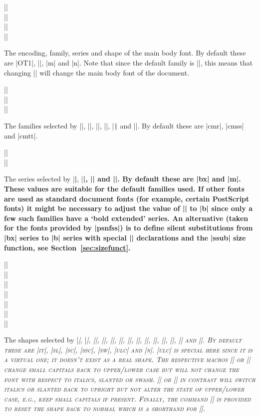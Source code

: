 \documentclass{ltxguide}[1995/11/28]
\begin{document}
\begin{decl}
  |\encodingdefault| \\
  |\familydefault|   \\
  |\seriesdefault|   \\
  |\shapedefault|
\end{decl}
The encoding, family, series and shape of the main body font.  By
default these are |OT1|, |\rmdefault|, |m| and |n|.  Note that since the
default family is |\rmdefault|, this means that changing |\rmdefault|
will change the main body font of the document.

\begin{decl}
  |\rmdefault| \\
  |\sfdefault| \\
  |\ttdefault|
\end{decl}
The families selected by |\textrm|, |\rmfamily|, |\textsf|, |\sffamily|,
|\texttt| and |\ttfamily|.  By default these are |cmr|, |cmss| and
|cmtt|.

\begin{decl}
  |\bfdefault| \\
  |\mddefault|
\end{decl}
The series selected by |\textbf|, |\bfseries|, |\textmd| and
|\mdseries|.  By default these are |bx| and |m|.  These values are
suitable for the default families used. If other fonts are used as
standard document fonts (for example, certain PostScript fonts) it might
be necessary to adjust the value of |\bfdefault| to |b| since only a few
such families have a `bold extended' series.  An alternative (taken for
the fonts provided by |psnfss|) is to define silent substitutions from
|bx| series to |b| series with special |\DeclareFontShape| declarations
and the |ssub| size function, see Section~\ref{sec:sizefunct}.

\begin{decl}
  |\itdefault|  \\
  |\sldefault|  \\
  |\scdefault|  \\
  |\sscdefault| \\
  |\swdefault|  \\
  |\ulcdefault| \\
  |\updefault|
\end{decl}
The shapes selected by |\textit|, |\itshape|, |\textsl|, |\slshape|,
|\textsc|, |\scshape|, |\textssc|, |\sscshape|, |\textsw|, |\swshape|,
|\textulc|, |\ulcshape|, |\textup| and |\upshape|.  By default these are
|it|, |sl|, |sc|, |ssc|, |sw|, |ulc| and |n|.  |ulc| is special here
since it is a virtual one; it doesn't exist as a real shape.  The
respective macros |\textulc| or |\ulcshape| change small capitals back
to upper/lower case but will not change the font with respect to
italics, slanted or swash.  |\upshape| or |\textup| in contrast will
switch italics or slanted back to upright but not alter the state of
upper/lower case, e.g., keep small capitals if present.  Finally, the
command |\normalshape| is provided to reset the shape back to normal
which is a shorthand for |\upshape\ulcshape|.
\end{document}
